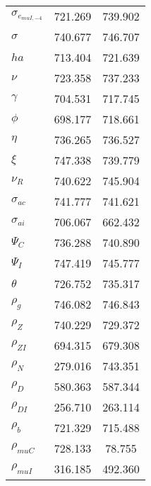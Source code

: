 \begin{center}
\begin{longtable}{lcc}
$ \sigma_{{e_{muI,-4}}}   $	 & 	     721.269	 & 	     739.902 \\ 
$ {\sigma}                $	 & 	     740.677	 & 	     746.707 \\ 
$ {ha}                    $	 & 	     713.404	 & 	     721.639 \\ 
$ \nu                     $	 & 	     723.358	 & 	     737.233 \\ 
$ \gamma                  $	 & 	     704.531	 & 	     717.745 \\ 
$ {\phi}                  $	 & 	     698.177	 & 	     718.661 \\ 
$ {\eta}                  $	 & 	     736.265	 & 	     736.527 \\ 
$ \xi                     $	 & 	     747.338	 & 	     739.779 \\ 
$ {\nu_R}                 $	 & 	     740.622	 & 	     745.904 \\ 
$ {\sigma_{ac}}           $	 & 	     741.777	 & 	     741.621 \\ 
$ {\sigma_{ai}}           $	 & 	     706.067	 & 	     662.432 \\ 
$ {\Psi_{C}}              $	 & 	     736.288	 & 	     740.890 \\ 
$ {\Psi_I}                $	 & 	     747.419	 & 	     745.777 \\ 
$ {\theta}                $	 & 	     726.752	 & 	     735.317 \\ 
$ {\rho_g}                $	 & 	     746.082	 & 	     746.843 \\ 
$ {\rho_Z}                $	 & 	     740.229	 & 	     729.372 \\ 
$ {\rho_{ZI}}             $	 & 	     694.315	 & 	     679.308 \\ 
$ {\rho_N}                $	 & 	     279.016	 & 	     743.351 \\ 
$ {\rho_D}                $	 & 	     580.363	 & 	     587.344 \\ 
$ {\rho_{DI}}             $	 & 	     256.710	 & 	     263.114 \\ 
$ {\rho_b}                $	 & 	     721.329	 & 	     715.488 \\ 
$ {\rho_{muC}}            $	 & 	     728.133	 & 	      78.755 \\ 
$ {\rho_{muI}}            $	 & 	     316.185	 & 	     492.360 \\ 
\end{longtable}
 \end{center}
